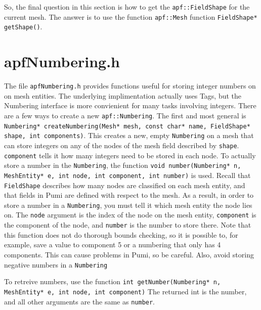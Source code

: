 \documentclass[12pt]{article}
\newcommand{\ttt}{\texttt}
\begin{document}
So, the final question in this section is how to get the \ttt{apf::FieldShape} for the current mesh.
The answer is to use the function \ttt{apf::Mesh} function \ttt{FieldShape* getShape()}.

\section{apfNumbering.h}
The file \ttt{apfNumbering.h} provides functions useful for storing integer numbers on on mesh entities.  The underlying implimentation actually uses Tags, but the Numbering interface is more convienient for many tasks involving integers.  There are a few ways to create a new \ttt{apf::Numbering}.  The first and most general is
\newline
\newline
\noindent\ttt{Numbering* createNumbering(Mesh* mesh, const char* name, FieldShape* shape, int components)}.
\newline
\newline
This creates a new, empty \ttt{Numbering} on a mesh that can store integers on any of the nodes of the mesh field described by \ttt{shape}.  \ttt{component} tells it how many integers need to be stored in each node. To actually store a number in the \ttt{Numbering}, the function
\newline
\newline
\noindent\ttt{void number(Numbering* n, MeshEntity* e, int node, int component, int number)}
\newline
\newline
is used.  Recall that \ttt{FieldShape} describes how many nodes are classified on each mesh entity, and that fields in Pumi are defined with respect to the mesh.  As a result, in order to store a number in a \ttt{Numbering}, you must tell it which mesh entity the node lies on.  The \ttt{node} argument is the index of the node on the mesh entity, \ttt{component} is the component of the node, and \ttt{number} is the number to store there.  Note that this function does not do thorough bounds checking, so it is possible to, for example, save a value to component 5 or a numbering that only has 4 components.  This can cause problems in Pumi, so be careful. Also, avoid storing negative numbers in a \ttt{Numbering} 

To retreive numbers, use the function
\newline
\newline
\noindent\ttt{int getNumber(Numbering* n, MeshEntity* e, int node, int component)}
\newline
\newline
The returned int is the number, and all other arguments are the same as \ttt{number}.
\end{document}
